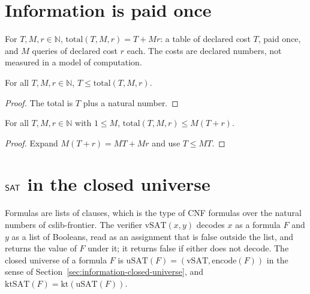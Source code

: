 \section{Information is paid once}
\label{sec:information-amortization}

\begin{definition}
  \label{def:information-total}
  \leanok
  For $T, M, r \in \mathbb{N}$, $\mathrm{total}(T, M, r) = T + M r$: a table of declared cost $T$,
  paid once, and $M$ queries of declared cost $r$ each. The costs are declared numbers, not
  measured in a model of computation.
  \own{}
\end{definition}

\begin{theorem}
  \label{thm:information-someone-paid}
  \leanok
  For all $T, M, r \in \mathbb{N}$, $T \le \mathrm{total}(T, M, r)$.
  \own{}
\end{theorem}

\begin{proof}
  \leanok
  The total is $T$ plus a natural number.
\end{proof}

\begin{theorem}
  \label{thm:information-amortized}
  \leanok
  For all $T, M, r \in \mathbb{N}$ with $1 \le M$, $\mathrm{total}(T, M, r) \le M (T + r)$.
  \own{}
\end{theorem}

\begin{proof}
  \leanok
  Expand $M (T + r) = M T + M r$ and use $T \le M T$.
\end{proof}

\section{$\mathsf{SAT}$ in the closed universe}
\label{sec:information-sat-closed}

Formulas are lists of clauses, which is the type of CNF formulas over the natural numbers of
cslib-frontier. The verifier $\mathrm{vSAT}(x, y)$ decodes $x$ as a formula $F$ and $y$ as a list of
Booleans, read as an assignment that is false outside the list, and returns the value of $F$ under
it; it returns false if either does not decode. The closed universe of a formula $F$ is
$\mathrm{uSAT}(F) = (\mathrm{vSAT}, \mathrm{encode}(F))$ in the sense of
Section~\ref{sec:information-closed-universe}, and $\mathrm{ktSAT}(F) = \mathrm{kt}(\mathrm{uSAT}(F))$.

